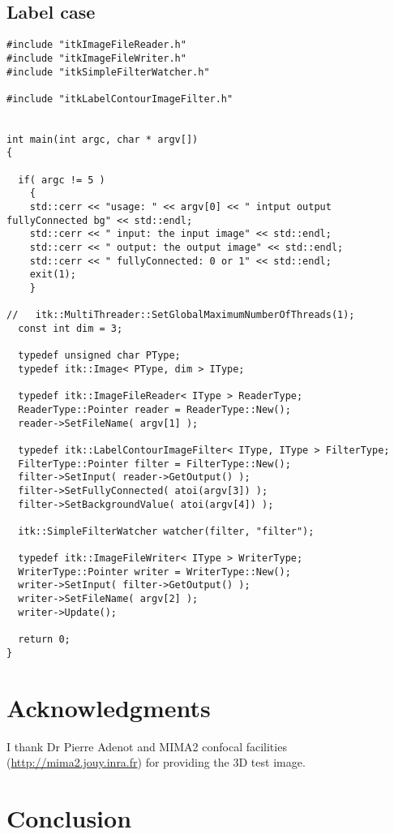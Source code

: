 \documentclass{InsightArticle}
\begin{document}
\subsection{Label case}
\small \begin{verbatim}
#include "itkImageFileReader.h"
#include "itkImageFileWriter.h"
#include "itkSimpleFilterWatcher.h"

#include "itkLabelContourImageFilter.h"


int main(int argc, char * argv[])
{

  if( argc != 5 )
    {
    std::cerr << "usage: " << argv[0] << " intput output fullyConnected bg" << std::endl;
    std::cerr << " input: the input image" << std::endl;
    std::cerr << " output: the output image" << std::endl;
    std::cerr << " fullyConnected: 0 or 1" << std::endl;
    exit(1);
    }

//   itk::MultiThreader::SetGlobalMaximumNumberOfThreads(1);
  const int dim = 3;
  
  typedef unsigned char PType;
  typedef itk::Image< PType, dim > IType;

  typedef itk::ImageFileReader< IType > ReaderType;
  ReaderType::Pointer reader = ReaderType::New();
  reader->SetFileName( argv[1] );

  typedef itk::LabelContourImageFilter< IType, IType > FilterType;
  FilterType::Pointer filter = FilterType::New();
  filter->SetInput( reader->GetOutput() );
  filter->SetFullyConnected( atoi(argv[3]) );
  filter->SetBackgroundValue( atoi(argv[4]) );

  itk::SimpleFilterWatcher watcher(filter, "filter");

  typedef itk::ImageFileWriter< IType > WriterType;
  WriterType::Pointer writer = WriterType::New();
  writer->SetInput( filter->GetOutput() );
  writer->SetFileName( argv[2] );
  writer->Update();

  return 0;
}
\end{verbatim} \normalsize

\section{Acknowledgments}
I thank Dr Pierre Adenot and MIMA2 confocal facilities
(\url{http://mima2.jouy.inra.fr}) for providing the 3D test image.

\section{Conclusion}
\end{document}

